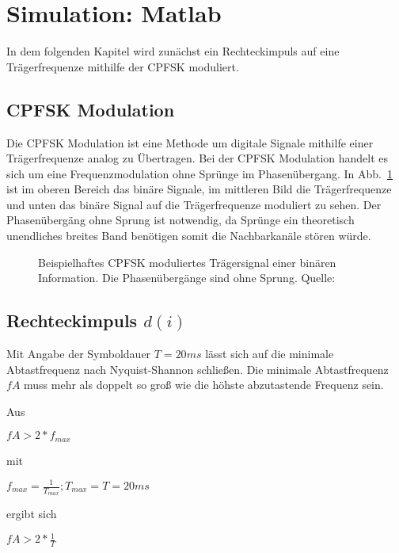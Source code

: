 \documentclass{article}
\begin{document}
\section{Simulation: Matlab}
In dem folgenden Kapitel wird zunächst ein Rechteckimpuls auf eine Trägerfrequenze mithilfe der \ac{CPFSK} moduliert.

\subsection{CPFSK Modulation}
Die \ac{CPFSK} Modulation ist eine Methode um digitale Signale mithilfe einer Trägerfrequenze analog zu Übertragen.
Bei der \ac{CPFSK} Modulation handelt es sich um eine Frequenzmodulation ohne Sprünge im Phasenübergang. In Abb.~\ref{fsk}
ist im oberen Bereich das binäre Signale, im mittleren Bild die Trägerfrequenze und unten das binäre Signal auf die Trägerfrequenze
moduliert zu sehen. Der Phasenübergäng ohne Sprung ist notwendig, da Sprünge ein theoretisch unendliches breites Band benötigen
somit die Nachbarkanäle stören würde.
\begin{figure}[!h]
    \centering
    \def\svgscale{0.3}
    \def\svgwidth{\columnwidth}
    
    \caption{Beispielhaftes \ac{CPFSK} moduliertes Trägersignal einer binären 
    Information. Die Phasenübergänge sind ohne Sprung. Quelle:~\cite{wiki:fsk}}
    \label{fsk}
\end{figure}
\subsection{Rechteckimpuls $d(i)$}
Mit Angabe der Symboldauer $T = 20ms$ lässt sich auf die minimale Abtastfrequenz nach Nyquist-Shannon schließen.
Die minimale Abtastfrequenz $fA$ muss mehr als doppelt so groß wie die höhste abzutastende Frequenz sein.


Aus
\begin{center}
 $
fA > 2*f_{max}
$
\end{center}

mit 
\begin{center} $f_{max} = \frac{1}{T_{max}} ; T_{max} = T = 20ms$  \end{center}

ergibt sich

\begin{center}
$
fA > 2*\frac{1}{T}
$
\end{center}
\end{document}
